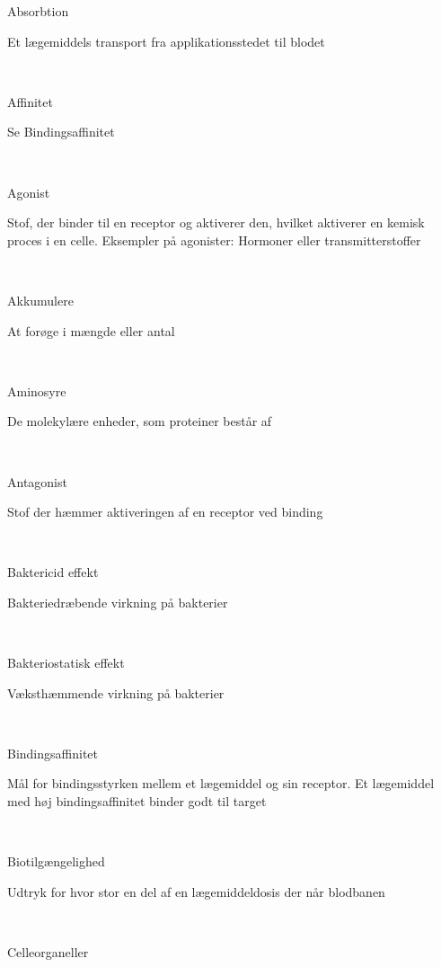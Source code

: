 \documentclass{article}
\begin{document}
\newcommand{\wordlist}[2]{\noindent\begin{minipage}[t]{4,5cm}#1\end{minipage}\begin{minipage}[t]{8cm}#2\end{minipage}\vspace{0.5cm}\\}

\wordlist{Absorbtion}{Et lægemiddels transport fra applikationsstedet til blodet}
\wordlist{Affinitet}{Se Bindingsaffinitet}
\wordlist{Agonist}{Stof, der binder til en receptor og aktiverer den, hvilket aktiverer en kemisk proces i en celle. Eksempler på agonister: Hormoner eller transmitterstoffer}
\wordlist{Akkumulere}{At forøge i mængde eller antal}
\wordlist{Aminosyre}{De molekylære enheder, som proteiner består af}
\wordlist{Antagonist}{Stof der hæmmer aktiveringen af en receptor ved binding}
\wordlist{Baktericid effekt}{Bakteriedræbende virkning på bakterier}
\wordlist{Bakteriostatisk effekt}{Væksthæmmende virkning på bakterier}
\wordlist{Bindingsaffinitet}{Mål for bindingsstyrken mellem et lægemiddel og sin receptor. Et lægemiddel med høj bindingsaffinitet binder godt til target}
\wordlist{Biotilgængelighed}{Udtryk for hvor stor en del af en lægemiddeldosis der når blodbanen}
\wordlist{Celleorganeller}{}


\newcommand{\Line}{\noindent\underline{\hspace{\textwidth}}\vspace{0.25cm}\\}

\Line
\Line
\Line
\Line
\end{document}
